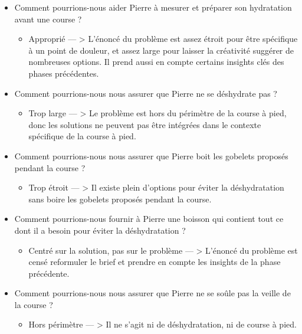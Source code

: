 \begin{itemize}
\item Comment pourrions-nous aider Pierre à mesurer et préparer son hydratation avant une course ?
\begin{itemize}
\item Approprié  --- > L'énoncé du problème est assez étroit pour être spécifique à un point de douleur, et assez large pour laisser la créativité suggérer de nombreuses options. Il prend aussi en compte certains insights clés des phases précédentes.
\end{itemize}
\item Comment pourrions-nous nous assurer que Pierre ne se déshydrate pas ?
\begin{itemize}
\item Trop large  --- > Le problème est hors du périmètre de la course à pied, donc les solutions ne peuvent pas être intégrées dans le contexte spécifique de la course à pied.
\end{itemize}
\item Comment pourrions-nous nous assurer que Pierre boit les gobelets proposés pendant la course ?
\begin{itemize}
\item Trop étroit  --- > Il existe plein d'options pour éviter la déshydratation sans boire les gobelets proposés pendant la course.
\end{itemize}
\item Comment pourrions-nous fournir à Pierre une boisson qui contient tout ce dont il a besoin pour éviter la déshydratation ?
\begin{itemize}
\item Centré sur la solution, pas sur le problème  --- > L'énoncé du problème est censé reformuler le brief et prendre en compte les insights de la phase précédente.
\end{itemize}
\item Comment pourrions-nous nous assurer que Pierre ne se soûle pas la veille de la course ?
\begin{itemize}
\item Hors périmètre  --- > Il ne s'agit ni de déshydratation, ni de course à pied.
\end{itemize}
\end{itemize}

